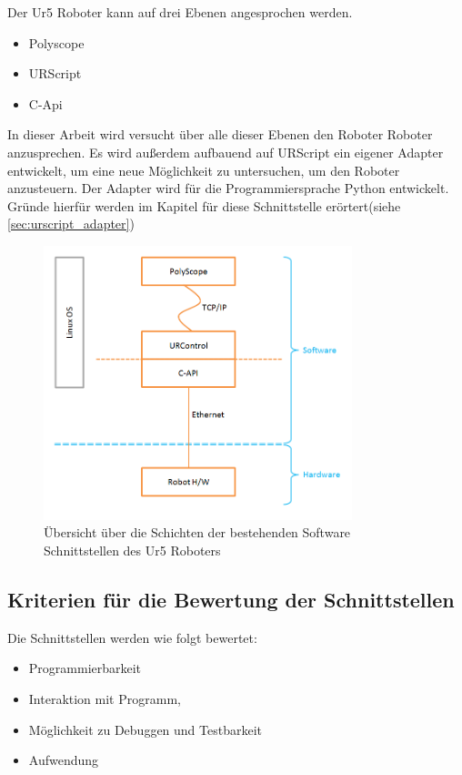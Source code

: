 Der Ur5 Roboter kann auf drei Ebenen angesprochen werden.\\

\begin{itemize}
\item Polyscope
\item URScript
\item C-Api
\end{itemize}

In dieser Arbeit wird versucht über alle dieser Ebenen den Roboter Roboter anzusprechen.
Es wird außerdem aufbauend auf URScript ein eigener Adapter entwickelt, um eine neue Möglichkeit zu untersuchen, um den Roboter anzusteuern.
Der Adapter wird für die Programmiersprache Python entwickelt. Gründe hierfür werden im Kapitel für diese Schnittstelle erörtert(siehe \ref{sec:urscript_adapter})

\begin{figure}[H]
  \centering
    \includegraphics[width=0.8\textwidth]{pic/ur_programming_levels.png}
      \caption[Schichten der Software Schnittstellen]{Übersicht über die
      Schichten der bestehenden Software Schnittstellen des Ur5 Roboters}
      \label{fig:schnittstellen_schichten}
\end{figure}

\subsection{Kriterien für die Bewertung der Schnittstellen}
\label{sub:criterias_of_solutions_kon}

Die Schnittstellen werden wie folgt bewertet:

\begin{itemize}
\item Programmierbarkeit
\item Interaktion mit Programm,
\item Möglichkeit zu Debuggen und Testbarkeit
\item Aufwendung
\end{itemize}

